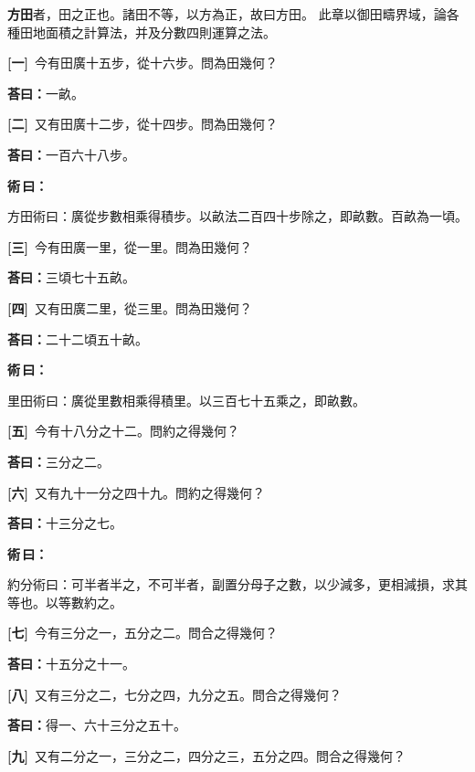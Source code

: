 \documentclass[11pt,a4paper]{article}
\newenvironment{method}{%
  \par\noindent\textcolor{methodcolor}{\textbf{術\,曰：}}%
  \ignorespaces
}{\par\vspace{0.5em}}
\newcommand{\problemnum}[1]{\textbf{[\ignorespaces#1\unskip]}}
\begin{document}
\noindent\textbf{方田}者，田之正也。諸田不等，以方為正，故曰方田。
此章以御田疇界域，論各種田地面積之計算法，并及分數四則運算之法。

\bigskip

\noindent\problemnum{一}\,
今有田廣十五步，從十六步。問為田幾何？

\noindent\textcolor{answercolor}{\textbf{荅曰：}}一畝。

\noindent\problemnum{二}\,
又有田廣十二步，從十四步。問為田幾何？

\noindent\textcolor{answercolor}{\textbf{荅曰：}}一百六十八步。

\begin{method}
方田術曰：廣從步數相乘得積步。以畝法二百四十步除之，即畝數。百畝為一頃。
\end{method}

\noindent\problemnum{三}\,
今有田廣一里，從一里。問為田幾何？

\noindent\textcolor{answercolor}{\textbf{荅曰：}}三頃七十五畝。

\noindent\problemnum{四}\,
又有田廣二里，從三里。問為田幾何？

\noindent\textcolor{answercolor}{\textbf{荅曰：}}二十二頃五十畝。

\begin{method}
里田術曰：廣從里數相乘得積里。以三百七十五乘之，即畝數。
\end{method}

\noindent\problemnum{五}\,
今有十八分之十二。問約之得幾何？

\noindent\textcolor{answercolor}{\textbf{荅曰：}}三分之二。

\noindent\problemnum{六}\,
又有九十一分之四十九。問約之得幾何？

\noindent\textcolor{answercolor}{\textbf{荅曰：}}十三分之七。

\begin{method}
約分術曰：可半者半之，不可半者，副置分母子之數，以少減多，更相減損，求其等也。以等數約之。
\end{method}

\noindent\problemnum{七}\,
今有三分之一，五分之二。問合之得幾何？

\noindent\textcolor{answercolor}{\textbf{荅曰：}}十五分之十一。

\noindent\problemnum{八}\,
又有三分之二，七分之四，九分之五。問合之得幾何？

\noindent\textcolor{answercolor}{\textbf{荅曰：}}得一、六十三分之五十。

\noindent\problemnum{九}\,
又有二分之一，三分之二，四分之三，五分之四。問合之得幾何？
\end{document}
